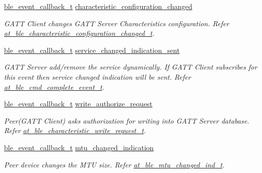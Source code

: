 \begin{DoxyCompactItemize}
\mbox{\hyperlink{ble__manager_8h_a04ce4bb8cb8282f2762e3924b1773cc9}{ble\+\_\+event\+\_\+callback\+\_\+t}} \mbox{\hyperlink{structble__gatt__server__event__cb_a9045a6f37cec8cb9bfd83567f653651a}{characteristic\+\_\+configuration\+\_\+changed}}
\begin{DoxyCompactList}\small\item\em G\+A\+TT Client changes G\+A\+TT Server Characteristics configuration. Refer \mbox{\hyperlink{structat__ble__characteristic__configuration__changed__t}{at\+\_\+ble\+\_\+characteristic\+\_\+configuration\+\_\+changed\+\_\+t}}. \end{DoxyCompactList}\item 
\mbox{\hyperlink{ble__manager_8h_a04ce4bb8cb8282f2762e3924b1773cc9}{ble\+\_\+event\+\_\+callback\+\_\+t}} \mbox{\hyperlink{structble__gatt__server__event__cb_a1d1df8c125e687ee86e171a498951a59}{service\+\_\+changed\+\_\+indication\+\_\+sent}}
\begin{DoxyCompactList}\small\item\em G\+A\+TT Server add/remove the service dynamically. If G\+A\+TT Client subscribes for this event then service changed indication will be sent. Refer \mbox{\hyperlink{structat__ble__cmd__complete__event__t}{at\+\_\+ble\+\_\+cmd\+\_\+complete\+\_\+event\+\_\+t}}. \end{DoxyCompactList}\item 
\mbox{\hyperlink{ble__manager_8h_a04ce4bb8cb8282f2762e3924b1773cc9}{ble\+\_\+event\+\_\+callback\+\_\+t}} \mbox{\hyperlink{structble__gatt__server__event__cb_ae84f0ecb2ade7b0d22fd24370470fba3}{write\+\_\+authorize\+\_\+request}}
\begin{DoxyCompactList}\small\item\em Peer(\+G\+A\+T\+T Client) asks authorization for writing into G\+A\+TT Server database. Refer \mbox{\hyperlink{structat__ble__characteristic__write__request__t}{at\+\_\+ble\+\_\+characteristic\+\_\+write\+\_\+request\+\_\+t}}. \end{DoxyCompactList}\item 
\mbox{\hyperlink{ble__manager_8h_a04ce4bb8cb8282f2762e3924b1773cc9}{ble\+\_\+event\+\_\+callback\+\_\+t}} \mbox{\hyperlink{structble__gatt__server__event__cb_af0e89d90da1ef55f018e81b470d21df3}{mtu\+\_\+changed\+\_\+indication}}
\begin{DoxyCompactList}\small\item\em Peer device changes the M\+TU size. Refer \mbox{\hyperlink{structat__ble__mtu__changed__ind__t}{at\+\_\+ble\+\_\+mtu\+\_\+changed\+\_\+ind\+\_\+t}}. \end{DoxyCompactList}\item 

\end{DoxyCompactItemize}
